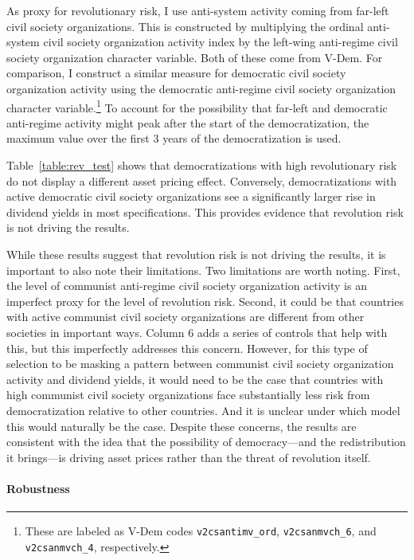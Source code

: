 As proxy for revolutionary risk, I use anti-system activity coming from far-left civil society organizations. This is constructed by multiplying the ordinal anti-system civil society organization activity index by the left-wing anti-regime civil society organization character variable. Both of these come from V-Dem. For comparison, I construct a similar measure for democratic civil society organization activity using the democratic anti-regime civil society organization character variable.\footnote{These are labeled as V-Dem codes  \texttt{v2csantimv\_ord}, \texttt{v2csanmvch\_6}, and \texttt{v2csanmvch\_4}, respectively.} To account for the possibility that far-left and democratic anti-regime activity might peak after the start of the democratization, the maximum value over the first 3 years of the democratization is used.

Table~\ref{table:rev_test} shows that democratizations with high revolutionary risk do not display a different asset pricing effect. Conversely, democratizations with active democratic civil society organizations see a significantly larger rise in dividend yields in most specifications. This provides evidence that revolution risk is not driving the results.



\label{par:rev_risk_hard}
While these results suggest that revolution risk is not driving the results, it is important to also note their limitations. Two limitations are worth noting. First, the level of communist anti-regime civil society organization activity is an imperfect proxy for the level of revolution risk. Second, it could be that countries with active communist civil society organizations are different from other societies in important ways. Column 6 adds a series of controls that help with this, but this imperfectly addresses this concern. However, for this type of selection to be masking a pattern between communist civil society organization activity and dividend yields, it would need to be the case that countries with high communist civil society organizations face substantially less risk from democratization relative to other countries. And it is unclear under which model this would naturally be the case.  Despite these concerns, the results are consistent with the idea that the possibility of democracy---and the redistribution it brings---is driving asset prices rather than the threat of revolution itself.
\label{par:rev_risk_end}

\paragraph{Robustness}

